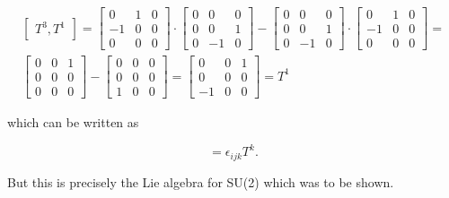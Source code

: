 \begin{gather*}
\begin{bmatrix}
T^3 , T^1
\end{bmatrix} =
\begin{bmatrix} 0 & 1 & 0 \\
 -1 & 0 & 0 \\
  0 & 0 & 0 
  \end{bmatrix}
  \cdot
  \begin{bmatrix} 0 & 0 & 0 \\
 0 & 0 & 1 \\
  0 & -1 & 0 
  \end{bmatrix}
  -
  \begin{bmatrix} 0 & 0 & 0 \\
 0 & 0 & 1 \\
  0 & -1 & 0 
  \end{bmatrix}
  \cdot
  \begin{bmatrix} 0 & 1 & 0 \\
 -1 & 0 & 0 \\
  0 & 0 & 0 
  \end{bmatrix} =\\
  \begin{bmatrix} 0 & 0 & 1 \\
 0 & 0 & 0 \\
  0 & 0 & 0 
  \end{bmatrix} -
  \begin{bmatrix} 0 & 0 & 0 \\
 0 & 0 & 0 \\
  1 & 0 & 0 
  \end{bmatrix} = 
  \begin{bmatrix} 0 & 0 & 1 \\
 0 & 0 & 0 \\
  -1 & 0 & 0 
  \end{bmatrix} =T^1
\end{gather*}

which can be written as

\begin{equation*}
[T^i,T^j]=\epsilon_{ijk}T^k.
\end{equation*}

But this is precisely the Lie algebra for SU(2) which was to be shown.